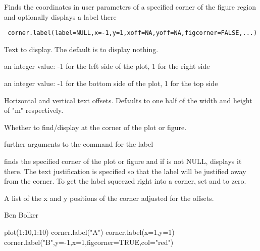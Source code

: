 \begin{Description}\relax
Finds the coordinates in user parameters of a specified corner of the
figure region and optionally displays a label there
\end{Description}
\begin{Usage}
\begin{verbatim}
 corner.label(label=NULL,x=-1,y=1,xoff=NA,yoff=NA,figcorner=FALSE,...)
\end{verbatim}
\end{Usage}
\begin{Arguments}
\begin{ldescription}
\item[\code{label}] Text to display. The default is to display nothing.
\item[\code{x}] an integer value: -1 for the left side of the plot, 1 for the
right side
\item[\code{y}] an integer value: -1 for the bottom side of the plot, 1 for
the top side
\item[\code{xoff,yoff}] Horizontal and vertical text offsets. Defaults to one
half of the width and height of "m" respectively. 
\item[\code{figcorner}] Whether to find/display at the corner of the plot or figure.
\item[\code{...}] further arguments to the  command for the label
\end{ldescription}
\end{Arguments}
\begin{Details}\relax
{} finds the specified corner of the plot or figure and if
 is not NULL, displays it there. The text justification is specified
so that the label will be justified away from the corner. To get the label
squeezed right into a corner, set  and  to zero.
\end{Details}
\begin{Value}
A list of the x and y positions of the corner adjusted for the offsets.
\end{Value}
\begin{Author}\relax
Ben Bolker
\end{Author}
\begin{Examples}
\begin{ExampleCode}
 plot(1:10,1:10)
 corner.label("A")
 corner.label(x=1,y=1)
 corner.label("B",y=-1,x=1,figcorner=TRUE,col="red")
\end{ExampleCode}
\end{Examples}

